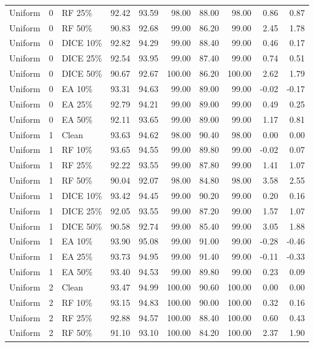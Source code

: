 {\begin{longtable}{rllrrrrrrr}
Uniform & 0 & RF 25\% & 92.42 & 93.59 & 98.00 & 88.00 & 98.00 & 0.86 & 0.87 \\
Uniform & 0 & RF 50\% & 90.83 & 92.68 & 99.00 & 86.20 & 99.00 & 2.45 & 1.78 \\
Uniform & 0 & DICE 10\% & 92.82 & 94.29 & 99.00 & 88.40 & 99.00 & 0.46 & 0.17 \\
Uniform & 0 & DICE 25\% & 92.54 & 93.95 & 99.00 & 87.40 & 99.00 & 0.74 & 0.51 \\
Uniform & 0 & DICE 50\% & 90.67 & 92.67 & 100.00 & 86.20 & 100.00 & 2.62 & 1.79 \\
Uniform & 0 & EA 10\% & 93.31 & 94.63 & 99.00 & 89.00 & 99.00 & -0.02 & -0.17 \\
Uniform & 0 & EA 25\% & 92.79 & 94.21 & 99.00 & 89.00 & 99.00 & 0.49 & 0.25 \\
Uniform & 0 & EA 50\% & 92.11 & 93.65 & 99.00 & 89.00 & 99.00 & 1.17 & 0.81 \\
Uniform & 1 & Clean & 93.63 & 94.62 & 98.00 & 90.40 & 98.00 & 0.00 & 0.00 \\
Uniform & 1 & RF 10\% & 93.65 & 94.55 & 99.00 & 89.80 & 99.00 & -0.02 & 0.07 \\
Uniform & 1 & RF 25\% & 92.22 & 93.55 & 99.00 & 87.80 & 99.00 & 1.41 & 1.07 \\
Uniform & 1 & RF 50\% & 90.04 & 92.07 & 98.00 & 84.80 & 98.00 & 3.58 & 2.55 \\
Uniform & 1 & DICE 10\% & 93.42 & 94.45 & 99.00 & 90.20 & 99.00 & 0.20 & 0.16 \\
Uniform & 1 & DICE 25\% & 92.05 & 93.55 & 99.00 & 87.20 & 99.00 & 1.57 & 1.07 \\
Uniform & 1 & DICE 50\% & 90.58 & 92.74 & 99.00 & 85.40 & 99.00 & 3.05 & 1.88 \\
Uniform & 1 & EA 10\% & 93.90 & 95.08 & 99.00 & 91.00 & 99.00 & -0.28 & -0.46 \\
Uniform & 1 & EA 25\% & 93.73 & 94.95 & 99.00 & 91.40 & 99.00 & -0.11 & -0.33 \\
Uniform & 1 & EA 50\% & 93.40 & 94.53 & 99.00 & 89.80 & 99.00 & 0.23 & 0.09 \\
Uniform & 2 & Clean & 93.47 & 94.99 & 100.00 & 90.60 & 100.00 & 0.00 & 0.00 \\
Uniform & 2 & RF 10\% & 93.15 & 94.83 & 100.00 & 90.00 & 100.00 & 0.32 & 0.16 \\
Uniform & 2 & RF 25\% & 92.88 & 94.57 & 100.00 & 88.40 & 100.00 & 0.60 & 0.43 \\
Uniform & 2 & RF 50\% & 91.10 & 93.10 & 100.00 & 84.20 & 100.00 & 2.37 & 1.90 \\

\end{longtable}}
